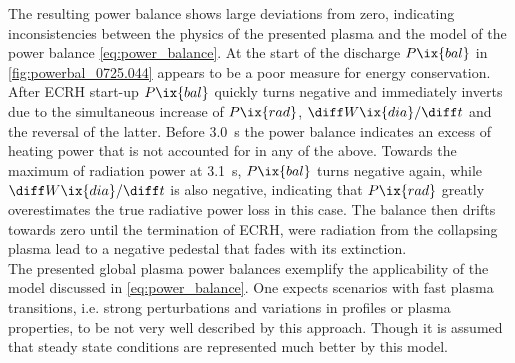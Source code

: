             The resulting power balance shows large deviations from zero, indicating inconsistencies between the physics of the presented plasma and the model of the power balance \cref{eq:power_balance}. At the start of the discharge $P\ix{bal}$ in \cref{fig:powerbal_0725.044} appears to be a poor measure for energy conservation. After ECRH start-up $P\ix{bal}$ quickly turns negative and immediately inverts due to the simultaneous increase of $P\ix{rad}$, $\diff W\ix{dia}/\diff t$ and the reversal of the latter. Before \SI{3.0}{\second} the power balance indicates an excess of heating power that is not accounted for in any of the above. Towards the maximum of radiation power at \SI{3.1}{\second}, $P\ix{bal}$ turns negative again, while $\diff W\ix{dia}/\diff t$ is also negative, indicating that $P\ix{rad}$ greatly overestimates the true radiative power loss in this case. The balance then drifts towards zero until the termination of ECRH, were radiation from the collapsing plasma lead to a negative pedestal that fades with its extinction.\\%
            The presented global plasma power balances exemplify the applicability of the model discussed in \cref{eq:power_balance}. One expects scenarios with fast plasma transitions, i.e. strong perturbations and variations in profiles or plasma properties, to be not very well described by this approach. Though it is assumed that steady state conditions are represented much better by this model.\\%
            \,\newline%
%